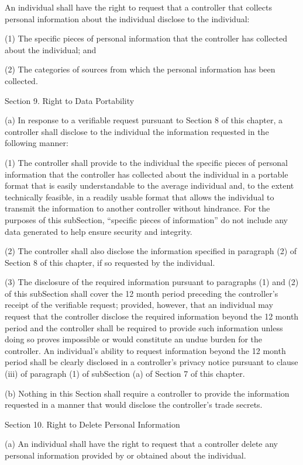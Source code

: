 An individual shall have the right to request that a controller that collects personal information about the individual disclose to the individual:

(1) The specific pieces of personal information that the controller has collected about the individual; and

(2) The categories of sources from which the personal information has been collected.

Section 9. Right to Data Portability

(a) In response to a verifiable request pursuant to Section 8 of this chapter, a controller shall disclose to the individual the information requested in the following manner:

(1) The controller shall provide to the individual the specific pieces of personal information that the controller has collected about the individual in a portable format that is easily understandable to the average individual and, to the extent technically feasible, in a readily usable format that allows the individual to transmit the information to another controller without hindrance. For the purposes of this subSection, “specific pieces of information” do not include any data generated to help ensure security and integrity.

(2) The controller shall also disclose the information specified in paragraph (2) of Section 8 of this chapter, if so requested by the individual. 

(3) The disclosure of the required information pursuant to paragraphs (1) and (2) of this subSection shall cover the 12 month period preceding the controller’s receipt of the verifiable request; provided, however, that an individual may request that the controller disclose the required information beyond the 12 month period and the controller shall be required to provide such information unless doing so proves impossible or would constitute an undue burden for the controller. An individual’s ability to request information beyond the 12 month period shall be clearly disclosed in a controller’s privacy notice pursuant to clause (iii) of paragraph (1) of subSection (a) of Section 7 of this chapter. 

(b) Nothing in this Section shall require a controller to provide the information requested in a manner that would disclose the controller’s trade secrets. 

Section 10. Right to Delete Personal Information

(a) An individual shall have the right to request that a controller delete any personal information provided by or obtained about the individual.

